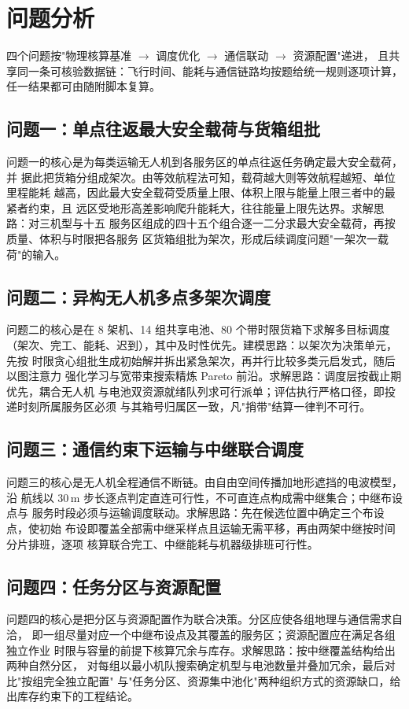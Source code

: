 \section{问题分析}
\label{sec:analysis}

四个问题按"物理核算基准 $\to$ 调度优化 $\to$ 通信联动 $\to$ 资源配置"递进，
且共享同一条可核验数据链：飞行时间、能耗与通信链路均按题给统一规则逐项计算，
任一结果都可由随附脚本复算。

\subsection{问题一：单点往返最大安全载荷与货箱组批}

问题一的核心是为每类运输无人机到各服务区的单点往返任务确定最大安全载荷，并
据此把货箱分组成架次。由等效航程法可知，载荷越大则等效航程越短、单位里程能耗
越高，因此最大安全载荷受质量上限、体积上限与能量上限三者中的最紧者约束，且
远区受地形高差影响爬升能耗大，往往能量上限先达界。求解思路：对三机型与十五
服务区组成的四十五个组合逐一二分求最大安全载荷，再按质量、体积与时限把各服务
区货箱组批为架次，形成后续调度问题"一架次一载荷"的输入。

\subsection{问题二：异构无人机多点多架次调度}

问题二的核心是在 8 架机、14 组共享电池、80 个带时限货箱下求解多目标调度
（架次、完工、能耗、迟到），其中及时性优先。建模思路：以架次为决策单元，先按
时限贪心组批生成初始解并拆出紧急架次，再并行比较多类元启发式，随后以图注意力
强化学习与宽带束搜索精炼 Pareto 前沿。求解思路：调度层按截止期优先，耦合无人机
与电池双资源就绪队列求可行派单；评估执行严格口径，即投递时刻所属服务区必须
与其箱号归属区一致，凡"捎带"结算一律判不可行。

\subsection{问题三：通信约束下运输与中继联合调度}

问题三的核心是无人机全程通信不断链。由自由空间传播加地形遮挡的电波模型，沿
航线以 30\,m 步长逐点判定直连可行性，不可直连点构成需中继集合；中继布设点与
服务时段必须与运输调度联动。求解思路：先在候选位置中确定三个布设点，使初始
布设即覆盖全部需中继采样点且运输无需平移，再由两架中继按时间分片排班，逐项
核算联合完工、中继能耗与机器级排班可行性。

\subsection{问题四：任务分区与资源配置}

问题四的核心是把分区与资源配置作为联合决策。分区应使各组地理与通信需求自洽，
即一组尽量对应一个中继布设点及其覆盖的服务区；资源配置应在满足各组独立作业
时限与容量的前提下核算冗余与库存。求解思路：按中继覆盖结构给出两种自然分区，
对每组以最小机队搜索确定机型与电池数量并叠加冗余，最后对比"按组完全独立配置"
与"任务分区、资源集中池化"两种组织方式的资源缺口，给出库存约束下的工程结论。
